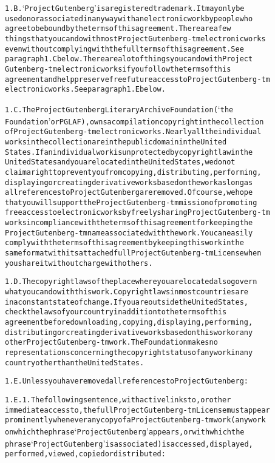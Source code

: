 \documentclass[12pt]{book}[2005/09/16]
\newenvironment{PGtext}{%
\begin{alltt}
\fontsize{9.2}{10.5}\ttfamily\selectfont}%
{\end{alltt}}
\begin{document}
\begin{PGtext}
1.B. `Project Gutenberg' is a registered trademark. It may only be
used on or associated in any way with an electronic work by people who
agree to be bound by the terms of this agreement. There are a few
things that you can do with most Project Gutenberg-tm electronic works
even without complying with the full terms of this agreement. See
paragraph 1.C below. There are a lot of things you can do with Project
Gutenberg-tm electronic works if you follow the terms of this
agreement and help preserve free future access to Project Gutenberg-tm
electronic works. See paragraph 1.E below.

1.C. The Project Gutenberg Literary Archive Foundation (`the
Foundation' or PGLAF), owns a compilation copyright in the collection
of Project Gutenberg-tm electronic works. Nearly all the individual
works in the collection are in the public domain in the United
States. If an individual work is unprotected by copyright law in the
United States and you are located in the United States, we do not
claim a right to prevent you from copying, distributing, performing,
displaying or creating derivative works based on the work as long as
all references to Project Gutenberg are removed. Of course, we hope
that you will support the Project Gutenberg-tm mission of promoting
free access to electronic works by freely sharing Project Gutenberg-tm
works in compliance with the terms of this agreement for keeping the
Project Gutenberg-tm name associated with the work. You can easily
comply with the terms of this agreement by keeping this work in the
same format with its attached full Project Gutenberg-tm License when
you share it without charge with others.

1.D. The copyright laws of the place where you are located also govern
what you can do with this work. Copyright laws in most countries are
in a constant state of change. If you are outside the United States,
check the laws of your country in addition to the terms of this
agreement before downloading, copying, displaying, performing,
distributing or creating derivative works based on this work or any
other Project Gutenberg-tm work. The Foundation makes no
representations concerning the copyright status of any work in any
country other than the United States.

1.E. Unless you have removed all references to Project Gutenberg:

1.E.1. The following sentence, with active links to, or other
immediate access to, the full Project Gutenberg-tm License must appear
prominently whenever any copy of a Project Gutenberg-tm work (any work
on which the phrase `Project Gutenberg' appears, or with which the
phrase `Project Gutenberg' is associated) is accessed, displayed,
performed, viewed, copied or distributed:


\end{PGtext}
\end{document}
